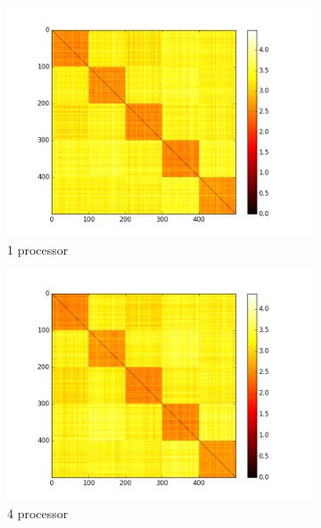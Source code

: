 \begin{figure}[ht!]
\centering

\begin{subfigure}{.45\textwidth}
\centering
\includegraphics[width=.99\linewidth]{img/chap3/heatmap_P1.png}
\caption{1 processor}\label{fig:c1}
\end{subfigure} 
\begin{subfigure}{.45\textwidth}
\centering
\includegraphics[width=.99\linewidth]{img/chap3/heatmap_P4.png}
\caption{4 processor}\label{fig:c2}
\end{subfigure} %
\hfill
\begin{subfigure}{.45\textwidth}
\centering

\end{subfigure}
\end{figure}
